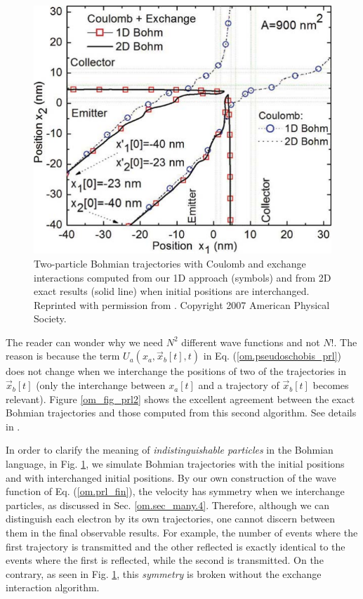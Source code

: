 \documentclass[nofootinbib, secnumarabic, amsmath, nobibnotes,10pt,aps,pra]{revtex4-1}
\newcommand{\fref}[1]{Fig. \ref{#1}}
\newcommand{\sref}[1]{Sec. \ref{#1}}
\newcommand{\eref}[1]{Eq. (\ref{#1})}
\newcommand{\Fref}[1]{Figure \ref{#1}}
\begin{document}
\begin{figure}
\centering
\includegraphics{F1_08.pdf}
\caption{Two-particle Bohmian trajectories with Coulomb and exchange interactions computed from
our 1D approach (symbols) and from 2D exact results (solid line)
when initial positions are interchanged. Reprinted with permission
from \cite{om.oriolsprl}. Copyright 2007 American Physical Society.
} \label{om_fig_prl3}
\end{figure}

The reader can wonder why we need $N^2$ different wave functions and not $N!$. The reason is because the term \textit{$U_{a}(x_{a},\vec x_{b}[t],t)$} in \eref{om.pseudoschobis_prl} does not change when we interchange the positions of two of the trajectories in $\vec x_{b}[t]$ (only the interchange between $x_a[t]$ and a trajectory of $\vec x_{b}[t]$ becomes relevant). \Fref{om_fig_prl2} shows the excellent agreement between the exact Bohmian trajectories and those computed from this second algorithm. See details in \cite{om.oriolsprl}.

In order to clarify the meaning of \textit{indistinguishable
particles} in the Bohmian language, in \fref{om_fig_prl3},
we  simulate Bohmian trajectories with the
initial positions and with interchanged initial positions. By our
own construction of the wave function of \eref{om.prl_fin}, the
velocity has symmetry when we interchange particles, as discussed in
\sref{om.sec_many.4}. Therefore, although we can distinguish each
electron by its own trajectories, one cannot discern between them in
the final observable results. For example, the number of events
where the first trajectory is transmitted and the other reflected is
exactly identical to the events where the first is reflected, while
the second is transmitted. On the contrary, as seen in
\fref{om_fig_prl3}, this \textit{symmetry} is broken without the
exchange interaction algorithm.
\end{document}

